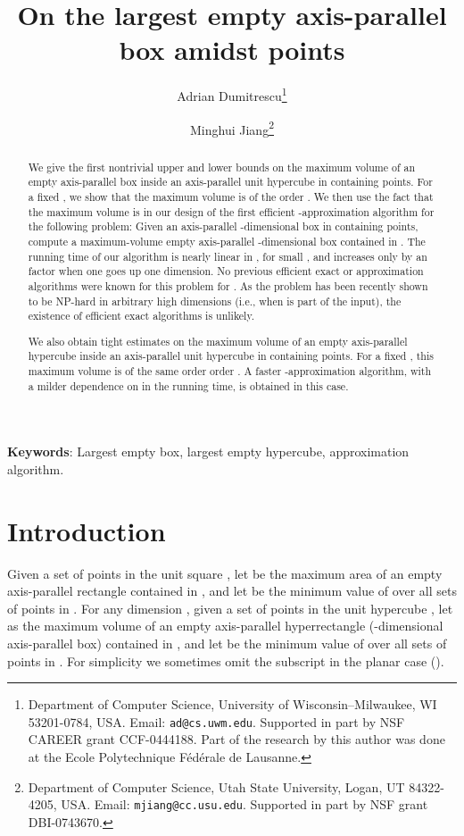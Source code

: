 \documentclass[11pt]{article}
\title{On the largest empty axis-parallel box amidst  points}
\author{Adrian Dumitrescu\thanks{Department of Computer Science,
University of Wisconsin--Milwaukee,
WI 53201-0784, USA\@. Email: \texttt{ad@cs.uwm.edu}.
Supported in part by NSF CAREER grant CCF-0444188.
Part of the research by this author was done at the
Ecole Polytechnique F\'ed\'erale de Lausanne.}
\and
Minghui Jiang\thanks{Department of Computer Science, 
Utah State University, Logan, UT 84322-4205, USA\@.
Email: \texttt{mjiang@cc.usu.edu}.
Supported in part by NSF grant DBI-0743670.}}
\begin{document}
\maketitle

\thispagestyle{empty}

\begin{abstract}
We give the first nontrivial upper and lower bounds on the maximum volume
of an empty axis-parallel box inside an axis-parallel unit hypercube
in  containing  points. 
For a fixed , we show that the maximum volume is of the order
.  We then  use the fact that the maximum volume is
 in our design of the first efficient
-approximation algorithm for the following problem: 
Given an axis-parallel -dimensional box  in 
containing  points, compute a maximum-volume empty axis-parallel
-dimensional box contained in . The running time of our
algorithm is nearly linear in , for small , and increases only
by an  factor when one goes up one dimension. 
No previous efficient exact or approximation algorithms were known for this
problem for . As the problem has been recently shown to be
NP-hard in arbitrary high dimensions (i.e., when  is part of the
input), the existence of efficient exact algorithms is unlikely.

We also obtain tight estimates on the maximum volume of an empty
axis-parallel hypercube inside an axis-parallel unit hypercube
in  containing  points. For a fixed , 
this maximum volume is of the same order order .  
A faster -approximation algorithm, with a  milder dependence
on  in the running time, is obtained in this case.  
\end{abstract}

\medskip
\hspace{0.15in}
\textbf{\small Keywords}:
Largest empty box, largest empty hypercube, approximation algorithm.


\newpage
\setcounter{page}{1}
\setcounter{footnote}{0}

\section{Introduction}

Given a set  of  points in the unit square ,
let  be the maximum area of an empty axis-parallel rectangle
contained in , and let  be the minimum value
of  over all sets  of  points in .
For any dimension , given a set  of  points in the unit 
hypercube , let  as the maximum volume of an
empty axis-parallel hyperrectangle (-dimensional axis-parallel box)
contained in , and let  be the minimum value of 
over all sets  of  points in .
For simplicity we sometimes omit the subscript  in the planar case (). 
\end{document}
